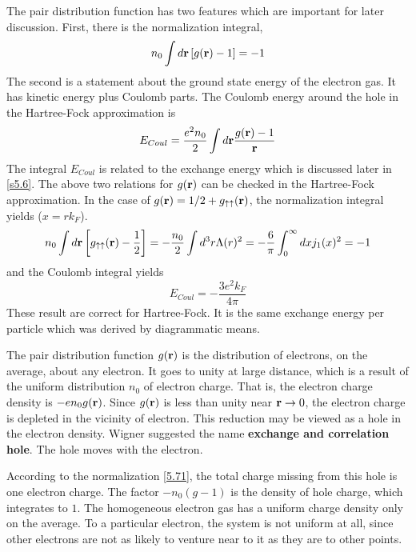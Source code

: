 The pair distribution function has two features which are important for later discussion.
First, there is the normalization integral,
\begin{equation}
    n_0 \int d\mathbf{r} \left[ g(\mathbf{r}) -1 \right] =-1  \label{5.71}
\end{equation}
The second is a statement about the ground state energy of the electron gas.
It has kinetic energy plus Coulomb parts.
The Coulomb energy around the hole in the Hartree-Fock approximation is
\begin{equation}
    E_{Coul} = \frac{e^2 n_0}{2} \int d \mathbf{r} \frac{g(\mathbf{r})-1}{\mathbf{r}}    \label{5.72}
\end{equation}
The integral $E_{Coul}$ is related to the exchange energy which is discussed later in \ref{s5.6}.
The above two relations for $g(\mathbf{r})$ can be checked in the Hartree-Fock approximation.
In the case of $g(\mathbf{r})=1/2 + g_{\uparrow\uparrow}(\mathbf{r})$, the normalization integral yields ($x=rk_F$).
\begin{equation}
    n_0 \int d \mathbf{r} \left[ g_{\uparrow\uparrow}(\mathbf{r}) - \frac{1}{2} \right] = - \frac{n_0}{2} \int d^3 r \Lambda(r)^2 = -\frac{6}{\pi} \int_0^\infty dx j_1(x)^2 = -1     \nonumber
\end{equation}
and the Coulomb integral yields
\begin{equation}
    E_{Coul} = - \frac{3 e^2 k_F}{4\pi}     \label{5.73}
\end{equation}
These result are correct for Hartree-Fock. It is the same exchange energy per particle which was derived by diagrammatic means.

The pair distribution function $g(\mathbf{r})$ is the distribution of electrons, on the average, about any electron.
It goes to unity at large distance, which is a result of the uniform distribution $n_0$ of electron charge.
That is, the electron charge density is $-en_0g(\mathbf{r})$.
Since $g(\mathbf{r})$ is less than unity near $\mathbf{r} \to 0$, the electron charge is depleted in the vicinity of electron.
This reduction may be viewed as a hole in the electron density.
Wigner suggested the name \textbf{exchange and correlation hole}.
The hole moves with the electron.

According to the normalization \eqref{5.71}, the total charge missing from this hole is one electron charge.
The factor $-n_0(g-1)$ is the density of hole charge, which integrates to $1$.
The homogeneous electron gas has a uniform charge density only on the average.
To a particular electron, the system is not uniform at all, since other electrons are not as likely to venture near to it as they are to other points.

